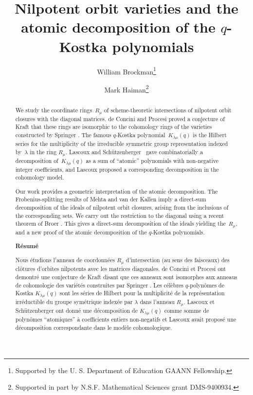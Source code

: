 \documentclass[12pt]{article}
\title{Nilpotent orbit varieties and the atomic decomposition of the $q$-Kostka polynomials}
\author{William Brockman\thanks{Supported by the U. S. Department of Education GAANN Fellowship.}\and 
Mark Haiman\thanks{Supported in part by N.S.F. Mathematical Sciences grant
DMS-9400934.}}
\newcommand{\LS}{Lascoux and Sch\"{u}tzenberger}
\numberwithin{equation}{section}
\theoremstyle{plain}
\theoremstyle{definition}
\theoremstyle{remark}
\begin{document}
\maketitle
\thispagestyle{empty}
\begin{abstract}
We study the coordinate rings~$R_{\mu}$ of scheme-theoretic
intersections of nilpotent orbit closures with the diagonal matrices.
de Concini and Procesi \cite{deConcini&Procesi} proved a conjecture of
Kraft \cite{Kraft} that these rings are isomorphic to the cohomology
rings of the varieties constructed by Springer
\cite{Springer76,Springer78}.  The famous $q$-Kostka
polynomial~$K_{\lambda\mu}(q)$ is the Hilbert series for the
multiplicity of the irreducible symmetric group representation indexed
by~$\lambda$ in the ring $R_\mu$.  \LS~\cite{L&S:Plaxique,Lascoux} gave
combinatorially a decomposition of~$K_{\lambda \mu}(q)$ as a sum of
``atomic'' polynomials with non-negative integer coefficients, and
Lascoux proposed a corresponding decomposition in the cohomology model.

Our work provides a geometric interpretation of the atomic
decomposition.  The Frobenius-splitting results of Mehta and van der
Kallen \cite{Mehta&vanderKallen} imply a direct-sum decomposition of
the ideals of nilpotent orbit closures, arising from the inclusions of
the corresponding sets.  We carry out the restriction to the diagonal
using a recent theorem of Broer \cite{Broer}.  This gives a direct-sum
decomposition of the ideals yielding the~$R_{\mu}$, and a new proof of
the atomic decomposition of the $q$-Kostka polynomials.

\begin{center}
{\bf R\'esum\'e}
\end{center}

Nous \'etudions l'anneau de coordonn\'ees
$R_{\mu}$ d'intersection (au sens des faisceaux) des cl\^otures
d'orbites nilpotents avec les matrices diagonales.  
de Concini et Procesi \cite{deConcini&Procesi} ont demontr\'e une
conjecture de Kraft \cite{Kraft} disant que ces anneaux sont
isomorphes aux anneaus de cohomologie des vari\'et\'es construites par
Springer \cite{Springer76,Springer78}.  Les c\'el\`ebres
$q$-polyn\^omes de Kostka $K_{\lambda\mu}(q)$ sont les s\'eries de
Hilbert pour la multiplicit\'e de la repr\'esentation irr\'eductible
du groupe sym\'etrique index\'ee par $\lambda$ dans l'anneau $R_\mu$.
Lascoux et Sch\"utzenberger \cite{L&S:Plaxique,Lascoux} ont donn\'e
une d\'ecomposition de $K_{\lambda\mu}(q)$ comme somme de polyn\^omes
``atomiques'' \`a coefficients entiers non-negatifs et Lascoux avait
propos\'e une d\'ecomposition correspondante dans le mod\`ele
cohomologique.


\end{abstract}
\end{document}
